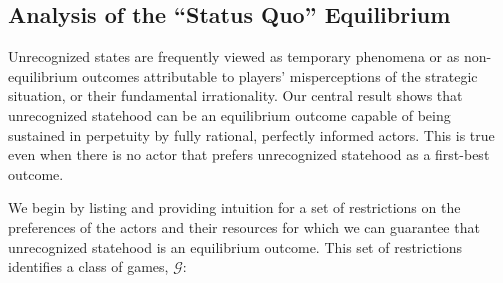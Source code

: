 \documentclass[11pt,letterpaper, notitlepage]{article}
\begin{document}
\subsection{Analysis of the ``Status Quo'' Equilibrium} 
\label{sec:mainproof}
Unrecognized states are frequently viewed as temporary phenomena or as non-equilibrium outcomes attributable to players' misperceptions of the strategic situation, or their fundamental irrationality. Our central result shows that unrecognized statehood can be an equilibrium outcome capable of being sustained in perpetuity by fully rational, perfectly informed actors. This is true even when there is no actor that prefers unrecognized statehood as a first-best outcome.

We begin by listing and providing intuition for a set of restrictions on the preferences of the actors and their resources for which we can guarantee that unrecognized statehood is an equilibrium outcome. This set of restrictions identifies a class of games, $\mathcal{G}$: 
\end{document}
